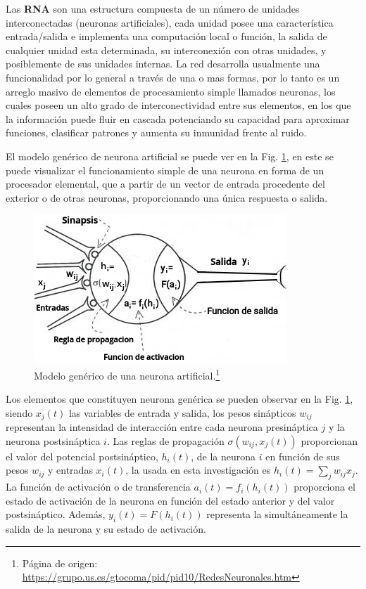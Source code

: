 
Las \textbf{RNA} son una estructura compuesta de un número de unidades interconectadas (neuronas artificiales), cada unidad posee una característica entrada/salida e implementa una computación local o función, la salida de cualquier unidad esta determinada, su interconexión con otras unidades, y posiblemente de sus unidades internas. La red desarrolla usualmente una funcionalidad por lo general a través de una o mas formas, por lo tanto es un arreglo masivo de elementos de procesamiento simple llamados neuronas, los cuales poseen un alto grado de interconectividad entre sus elementos, en los que la información puede fluir en cascada potenciando su capacidad para aproximar funciones, clasificar patrones y aumenta su inmunidad frente al ruido. 

El modelo genérico de neurona artificial se puede ver en la Fig. \ref{generico}, en este se puede visualizar el funcionamiento simple de una neurona en forma de un procesador elemental, que a partir de un vector de entrada procedente del exterior o de otras neuronas, proporcionando una única respuesta o salida.

\begin{figure}[!t]
\centering
\includegraphics[width=.7\textwidth]{Cap3/imagenes/generico.png}
\caption[Modelo genérico de una neurona artificial.]{Modelo genérico de una neurona artificial.\footnote{Página de origen: \href{https://grupo.us.es/gtocoma/pid/pid10/RedesNeuronales.htm}{https://\-gru\-po.\-us.\-es/\-gto\-coma/\-pid/\-pid10/\-Re\-des\-Neu\-ro\-na\-les.\-htm}}}
\label{generico}
\end{figure}

Los elementos que constituyen neurona genérica se pueden observar en la Fig. \ref{generico}, siendo $x_j(t)$ las variables de entrada y salida, los pesos sinápticos $w_{ij}$ representan la intensidad de interacción entre cada neurona presináptica $j$ y la neurona postsináptica $i$. Las reglas de propagación $\sigma(w_{ij}, x_j(t))$ proporcionan el valor del potencial postsináptico, $h_i(t)$, de la neurona $i$ en función de sus pesos $w_{ij}$ y entradas $x_i(t)$, la usada en esta investigación es $h_i (t) = \sum_j w_{ij} x_j$. La función de activación o de transferencia $a_i(t) = f_i(h_i(t))$ proporciona el estado de activación de la neurona en función del estado anterior y del valor postsináptico. Además, $y_i(t) = F(h_i(t))$ representa la simultáneamente la salida de la neurona y su estado de activación. 

